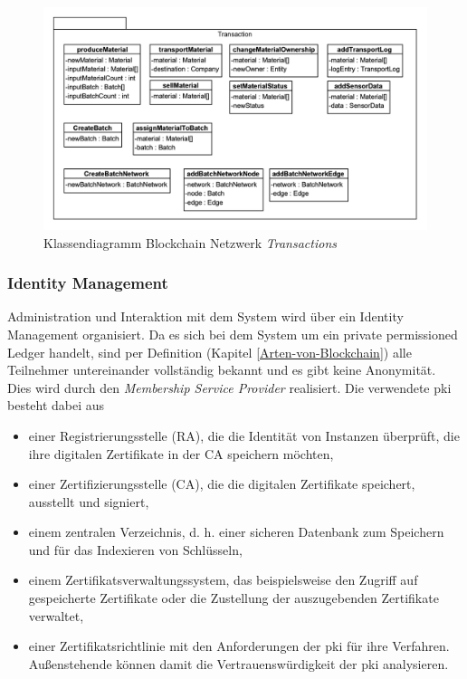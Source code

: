 \begin{figure}[H]
	\centering
	\includegraphics[width=1\linewidth]{pictures/hlc-food-chain-model-transactions}
	\caption[Klassendiagramm Blockchain Netzwerk \textit{Transactions}]{Klassendiagramm Blockchain Netzwerk \textit{Transactions}}
	\label{fig:hlc-food-chain-model-transactions}
\end{figure}


\subsubsection{Identity Management}
Administration und Interaktion mit dem System wird über ein Identity Management organisiert. Da es sich bei dem System um ein private permissioned Ledger handelt, sind per Definition (Kapitel \ref{Arten-von-Blockchain}) alle Teilnehmer untereinander vollständig bekannt und es gibt keine Anonymität. Dies wird durch den \textit{Membership Service Provider} realisiert. Die verwendete \acf{pki} besteht dabei aus

\begin{itemize}
	\item einer Registrierungsstelle (RA), die die Identität von Instanzen überprüft, die ihre digitalen Zertifikate in der CA speichern möchten,
	\item einer Zertifizierungsstelle (CA), die die digitalen Zertifikate speichert, ausstellt und signiert,
	\item einem zentralen Verzeichnis, d. h. einer sicheren Datenbank zum Speichern und für das Indexieren von Schlüsseln,
	\item einem Zertifikatsverwaltungssystem, das beispielsweise den Zugriff auf gespeicherte Zertifikate oder die Zustellung der auszugebenden Zertifikate verwaltet,
	\item einer Zertifikatsrichtlinie mit den Anforderungen der \ac{pki} für ihre Verfahren. Außenstehende können damit die Vertrauenswürdigkeit der \ac{pki} analysieren.
\end{itemize}

